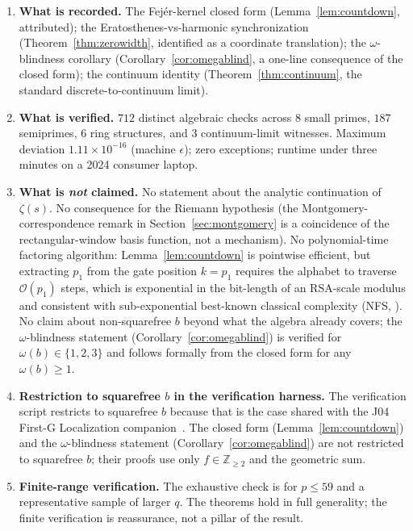 \documentclass[11pt,reqno]{amsart}
\theoremstyle{plain}
\theoremstyle{definition}
\theoremstyle{remark}
\newcommand{\Z}{\mathbb{Z}}
\newcommand{\bigO}{\mathcal{O}}
\begin{document}
\begin{enumerate}[label={\upshape(\arabic*)}]
\item \textbf{What is recorded.} The Fej\'er-kernel closed form
(Lemma~\ref{lem:countdown}, attributed); the
Eratosthenes-vs-harmonic synchronization
(Theorem~\ref{thm:zerowidth}, identified as a coordinate
translation); the $\omega$-blindness corollary
(Corollary~\ref{cor:omegablind}, a one-line consequence of the
closed form); the continuum identity
(Theorem~\ref{thm:continuum}, the standard discrete-to-continuum
limit).

\item \textbf{What is verified.} $712$ distinct algebraic checks
across $8$ small primes, $187$ semiprimes, $6$ ring structures,
and $3$ continuum-limit witnesses. Maximum deviation
$1.11 \times 10^{-16}$ (machine $\epsilon$); zero exceptions;
runtime under three minutes on a 2024 consumer laptop.

\item \textbf{What is \emph{not} claimed.} No statement about
the analytic continuation of $\zeta(s)$. No consequence for the
Riemann hypothesis (the Montgomery-correspondence remark in
Section~\ref{sec:montgomery} is a coincidence of the
rectangular-window basis function, not a mechanism). No
polynomial-time factoring algorithm: Lemma~\ref{lem:countdown}
is pointwise efficient, but extracting $p_1$ from the gate
position $k = p_1$ requires the alphabet to traverse
$\bigO(p_1)$ steps, which is exponential in the bit-length of
an RSA-scale modulus and consistent with sub-exponential
best-known classical complexity (NFS,
\cite{LenstraEtAl1993}). No claim about non-squarefree $b$
beyond what the algebra already covers; the
$\omega$-blindness statement
(Corollary~\ref{cor:omegablind}) is verified for
$\omega(b) \in \{1, 2, 3\}$ and follows formally from the
closed form for any $\omega(b) \ge 1$.

\item \textbf{Restriction to squarefree $b$ in the verification
harness.} The verification script restricts to squarefree $b$
because that is the case shared with the J04 First-G
Localization companion~\cite{J04Sanders}. The closed form
(Lemma~\ref{lem:countdown}) and the $\omega$-blindness
statement (Corollary~\ref{cor:omegablind}) are not restricted
to squarefree $b$; their proofs use only $f \in \Z_{\ge 2}$
and the geometric sum.

\item \textbf{Finite-range verification.} The exhaustive check is
for $p \le 59$ and a representative sample of larger $q$. The
theorems hold in full generality; the finite verification is
reassurance, not a pillar of the result.
\end{enumerate}
\end{document}
